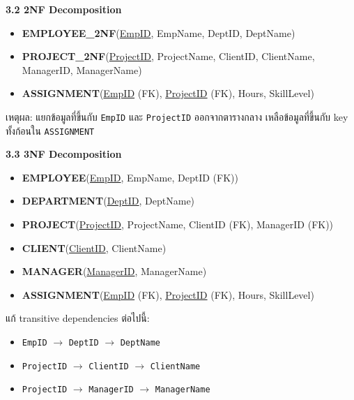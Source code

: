 \documentclass[a4paper,12pt]{article}
\begin{document}
\vspace{0.2cm}
\textbf{3.2 2NF Decomposition}
\begin{itemize}
    \item \textbf{EMPLOYEE\_2NF}(\uline{EmpID}, EmpName, DeptID, DeptName)
    \item \textbf{PROJECT\_2NF}(\uline{ProjectID}, ProjectName, ClientID, ClientName, ManagerID, ManagerName)
    \item \textbf{ASSIGNMENT}(\uline{EmpID} (FK), \uline{ProjectID} (FK), Hours, SkillLevel)
\end{itemize}
เหตุผล: แยกข้อมูลที่ขึ้นกับ \texttt{EmpID} และ \texttt{ProjectID} ออกจากตารางกลาง เหลือข้อมูลที่ขึ้นกับ key ทั้งก้อนใน \texttt{ASSIGNMENT}

\vspace{0.2cm}
\textbf{3.3 3NF Decomposition}
\begin{itemize}
    \item \textbf{EMPLOYEE}(\uline{EmpID}, EmpName, DeptID (FK))
    \item \textbf{DEPARTMENT}(\uline{DeptID}, DeptName)
    \item \textbf{PROJECT}(\uline{ProjectID}, ProjectName, ClientID (FK), ManagerID (FK))
    \item \textbf{CLIENT}(\uline{ClientID}, ClientName)
    \item \textbf{MANAGER}(\uline{ManagerID}, ManagerName)
    \item \textbf{ASSIGNMENT}(\uline{EmpID} (FK), \uline{ProjectID} (FK), Hours, SkillLevel)
\end{itemize}
แก้ transitive dependencies ต่อไปนี้:
\begin{itemize}
    \item \texttt{EmpID} $\rightarrow$ \texttt{DeptID} $\rightarrow$ \texttt{DeptName}
    \item \texttt{ProjectID} $\rightarrow$ \texttt{ClientID} $\rightarrow$ \texttt{ClientName}
    \item \texttt{ProjectID} $\rightarrow$ \texttt{ManagerID} $\rightarrow$ \texttt{ManagerName}
\end{itemize}
\end{document}
